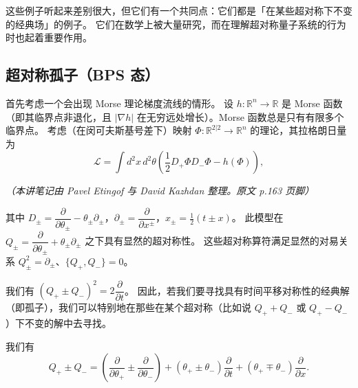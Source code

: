 这些例子听起来差别很大，但它们有一个共同点：它们都是「在某些超对称下不变的经典场」的例子。
它们在数学上被大量研究，而在理解超对称量子系统的行为时也起着重要作用。

\subsection{超对称孤子（BPS 态）}

首先考虑一个会出现 Morse 理论梯度流线的情形。
设 $h:\mathbb{R}^n\to\mathbb{R}$ 是 Morse 函数（即其临界点非退化，且 $|\nabla h|$ 在无穷远处增长）。Morse 函数总是只有有限多个临界点。
考虑（在闵可夫斯基号差下）映射 $\Phi:\mathbb{R}^{2|2}\to\mathbb{R}^n$ 的理论，其拉格朗日量为
\begin{equation}
  \tag{12.1}
  \label{eq:12-1}
  \mathcal{L}=\int d^2x\,d^2\theta\left(\frac12D_+\Phi D_-\Phi-h(\Phi)\right),
\end{equation}

\noindent\textit{（本讲笔记由 Pavel Etingof 与 David Kazhdan 整理。原文 p.163 页脚）}

其中 $D_\pm=\dfrac{\partial}{\partial\theta_\pm}-\theta_\pm\partial_\pm$，$\partial_\pm=\dfrac{\partial}{\partial x^\pm}$，$x_\pm=\tfrac12(t\pm x)$。
此模型在 $Q_\pm=\dfrac{\partial}{\partial\theta_\pm}+\theta_\pm\partial_\pm$ 之下具有显然的超对称性。
这些超对称算符满足显然的对易关系 $Q_\pm^2=\partial_\pm$、$\{Q_+,Q_-\}=0$。

我们有 $(Q_+\pm Q_-)^2=2\dfrac{\partial}{\partial t}$。
因此，若我们要寻找具有时间平移对称性的经典解（即孤子），我们可以特别地在那些在某个超对称（比如说 $Q_++Q_-$ 或 $Q_+-Q_-$）下不变的解中去寻找。

我们有
\begin{equation}
  \tag{12.2}
  \label{eq:12-2}
  Q_+\pm Q_-=\left(\frac{\partial}{\partial\theta_+}\pm\frac{\partial}{\partial\theta_-}\right)
  +(\theta_+\pm\theta_-)\frac{\partial}{\partial t}+(\theta_+\mp\theta_-)\frac{\partial}{\partial x}.
\end{equation}


